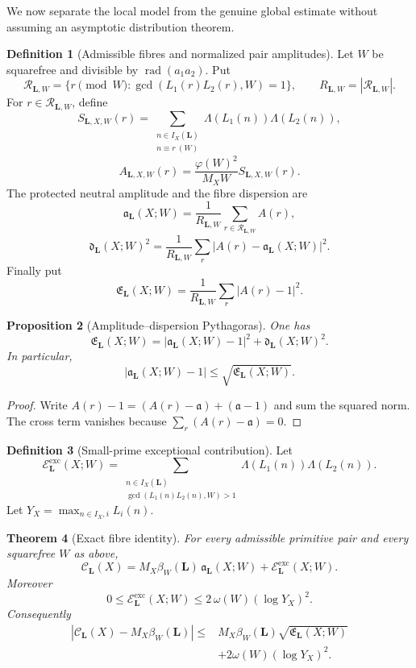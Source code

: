 \documentclass[11pt]{article}
\newtheorem{theorem}{Theorem}[section]
\newtheorem{proposition}[theorem]{Proposition}
\theoremstyle{definition}
\newtheorem{definition}[theorem]{Definition}
\theoremstyle{remark}
\newcommand{\rad}{\operatorname{rad}}
\newcommand{\abs}[1]{\left\lvert#1\right\rvert}
\newcommand{\exc}{\mathrm{exc}}
\begin{document}
We now separate the local model from the genuine global estimate without
assuming an asymptotic distribution theorem.

\begin{definition}[Admissible fibres and normalized pair amplitudes]
\label{def:fibre-amplitude}
Let $W$ be squarefree and divisible by $\rad(a_1a_2)$.  Put
\[
 \mathcal R_{\bm L,W}
 =\{r\pmod W:\gcd(L_1(r)L_2(r),W)=1\},
 \qquad R_{\bm L,W}=\abs{\mathcal R_{\bm L,W}}.
 \tag{9.1}
\]
For $r\in\mathcal R_{\bm L,W}$, define
\[
 S_{\bm L,X,W}(r)
 =\sum_{\substack{n\in I_X(\bm L)\\n\equiv r\ (W)}}
   \Lambda(L_1(n))\Lambda(L_2(n)),
 \tag{9.2}
\]
\[
 \boxed{
 A_{\bm L,X,W}(r)
 =\frac{\varphi(W)^2}{M_X W}
  S_{\bm L,X,W}(r).}
 \tag{9.3}
\]
The protected neutral amplitude and the fibre dispersion are
\[
 \mathfrak a_{\bm L}(X;W)
 =\frac1{R_{\bm L,W}}\sum_{r\in\mathcal R_{\bm L,W}}A(r),
 \tag{9.4}
\]
\[
 \mathfrak d_{\bm L}(X;W)^2
 =\frac1{R_{\bm L,W}}\sum_r
   \abs{A(r)-\mathfrak a_{\bm L}(X;W)}^2.
 \tag{9.5}
\]
Finally put
\[
 \mathfrak E_{\bm L}(X;W)
 =\frac1{R_{\bm L,W}}\sum_r\abs{A(r)-1}^2.
 \tag{9.6}
\]
\end{definition}

\begin{proposition}[Amplitude--dispersion Pythagoras]
\label{prop:amplitude-dispersion}
One has
\[
 \boxed{
 \mathfrak E_{\bm L}(X;W)
 =\abs{\mathfrak a_{\bm L}(X;W)-1}^2
  +\mathfrak d_{\bm L}(X;W)^2.}
 \tag{9.7}
\]
In particular,
\[
 \abs{\mathfrak a_{\bm L}(X;W)-1}
 \le\sqrt{\mathfrak E_{\bm L}(X;W)}.
 \tag{9.8}
\]
\end{proposition}

\begin{proof}
Write
$A(r)-1=(A(r)-\mathfrak a)+(\mathfrak a-1)$ and sum the squared norm.  The
cross term vanishes because $\sum_r(A(r)-\mathfrak a)=0$.
\end{proof}

\begin{definition}[Small-prime exceptional contribution]
Let
\[
 \mathcal E_{\bm L}^{\exc}(X;W)
 =\sum_{\substack{n\in I_X(\bm L)\\
 \gcd(L_1(n)L_2(n),W)>1}}
 \Lambda(L_1(n))\Lambda(L_2(n)).
 \tag{9.9}
\]
Let $Y_X=\max_{n\in I_X,i}L_i(n)$.
\end{definition}

\begin{theorem}[Exact fibre identity]
\label{thm:exact-fibre-identity}
For every admissible primitive pair and every squarefree $W$ as above,
\[
 \boxed{
 \mathcal C_{\bm L}(X)
 =M_X\beta_W(\bm L)\,
   \mathfrak a_{\bm L}(X;W)
  +\mathcal E_{\bm L}^{\exc}(X;W).}
 \tag{9.10}
\]
Moreover
\[
 \boxed{
 0\le\mathcal E_{\bm L}^{\exc}(X;W)
 \le2\,\omega(W)(\log Y_X)^2.}
 \tag{9.11}
\]
Consequently
\[
 \boxed{
 \begin{aligned}
 \abs{\mathcal C_{\bm L}(X)-M_X\beta_W(\bm L)}
 \le{}&M_X\beta_W(\bm L)
       \sqrt{\mathfrak E_{\bm L}(X;W)}\\
 &+2\omega(W)(\log Y_X)^2.
 \end{aligned}}
 \tag{9.12}
\]
\end{theorem}
\end{document}
